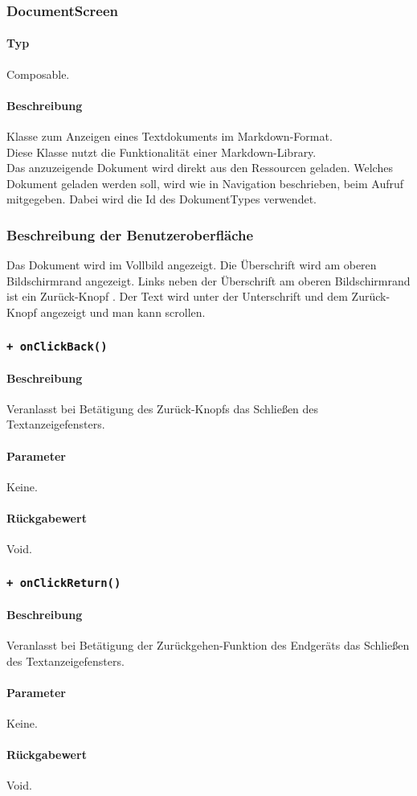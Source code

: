 \subsubsection{DocumentScreen}
\paragraph*{Typ}
Composable.
\paragraph*{Beschreibung}
Klasse zum Anzeigen eines Textdokuments im Markdown-Format.\\
Diese Klasse nutzt die Funktionalität einer Markdown-Library.\\
Das anzuzeigende Dokument wird direkt aus den Ressourcen geladen.
Welches Dokument geladen werden soll, wird wie in Navigation beschrieben, beim Aufruf mitgegeben. 
Dabei wird die Id des DokumentTypes verwendet.

\subsubsection*{Beschreibung der Benutzeroberfläche}
Das Dokument wird im Vollbild angezeigt.
Die Überschrift wird am oberen Bildschirmrand angezeigt.
Links neben der Überschrift am oberen Bildschirmrand ist ein \dq Zurück-Knopf \dq{}.
Der Text wird unter der Unterschrift und dem \dq Zurück-Knopf \dq{} angezeigt und man kann scrollen.

\subsubsection*{\texttt{+ onClickBack()}}%
\paragraph*{Beschreibung}
Veranlasst bei Betätigung des \dq Zurück-Knopfs \dq{} das Schließen des Textanzeigefensters.
\paragraph*{Parameter}
Keine.
\paragraph*{Rückgabewert}
Void.

\subsubsection*{\texttt{+ onClickReturn()}}%
\paragraph*{Beschreibung}
Veranlasst bei Betätigung der Zurückgehen-Funktion des Endgeräts das Schließen des Textanzeigefensters.
\paragraph*{Parameter}
Keine.
\paragraph*{Rückgabewert}
Void.